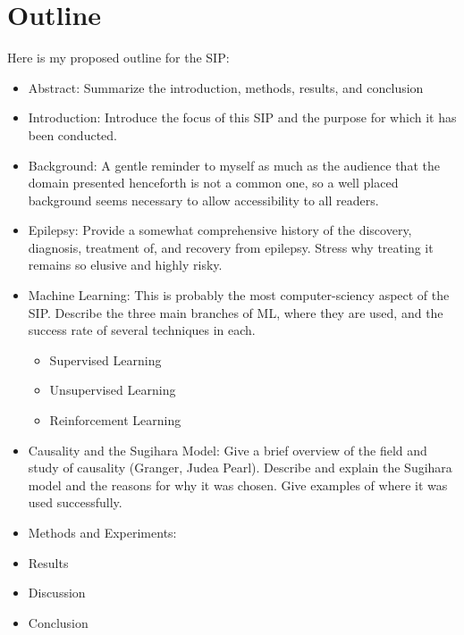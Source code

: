 \section{Outline}
Here is my proposed outline for the SIP:
\begin{itemize}
  \item Abstract: Summarize the introduction, methods, results, and conclusion

  \item Introduction: Introduce the focus of this SIP and the purpose for which it has been conducted.

  \item Background: A gentle reminder to myself as much as the audience that the domain presented henceforth is not a common one, so a well placed background seems necessary to allow accessibility to all readers.

	\item Epilepsy: Provide a somewhat comprehensive history of the discovery, diagnosis, treatment of, and recovery from epilepsy. Stress why treating it remains so elusive and highly risky.

	\item Machine Learning: This is probably the most computer-sciency aspect of the SIP. Describe the three main branches of ML, where they are used, and the success rate of several techniques in each.
		\begin{itemize}
			\item Supervised Learning
			\item Unsupervised Learning
			\item Reinforcement Learning
		\end{itemize}

	\item Causality and the Sugihara Model: Give a brief overview of the field and study of causality (Granger, Judea Pearl). Describe and explain the Sugihara model and the reasons for why it was chosen. Give examples of where it was used successfully.
  \item Methods and Experiments: 

  \item Results

  \item Discussion
  
  \item Conclusion 
\end{itemize}